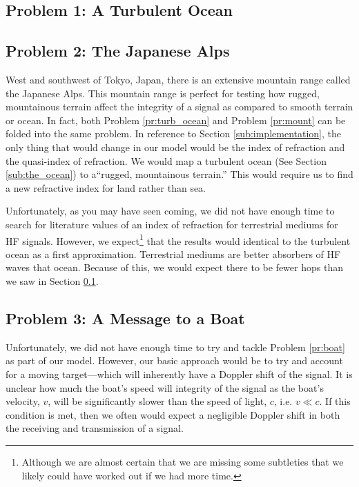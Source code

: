 \documentclass[11pt]{article}
\numberwithin{equation}{section}
\begin{document}
 \subsection{Problem 1: A Turbulent Ocean} %
 \label{sub:part_i}

 \subsection{Problem 2: The Japanese Alps} %
 \label{sub:part_ii}
 West and southwest of Tokyo, Japan, there is an extensive mountain range called the Japanese Alps. This mountain range is perfect for testing how rugged, mountainous terrain affect the integrity of a signal as compared to smooth terrain or ocean. In fact, both Problem \ref{pr:turb_ocean} and Problem \ref{pr:mount} can be folded into the same problem. In reference to Section \ref{sub:implementation}, the only thing that would change in our model would be the index of refraction and the quasi-index of refraction. We would map a turbulent ocean (See Section \ref{sub:the_ocean}) to  a``rugged, mountainous terrain.'' This would require us to find a new refractive index for land rather than sea.

 Unfortunately, as you may have seen coming, we did not have enough time to search for literature values of an index of refraction for terrestrial mediums for HF signals. However, we expect\footnote{Although we are almost certain that we are missing some subtleties that we likely could have worked out if we had more time. }  that the results would identical to the turbulent ocean as a first approximation. Terrestrial mediums are better absorbers of HF waves that ocean. Because of this, we would expect there to be fewer hops than we saw in Section \ref{sub:part_i}.

 \subsection{Problem 3: A Message to a Boat} %
 \label{sub:part_iii}
 
 Unfortunately, we did not have enough time to try and tackle Problem \ref{pr:boat} as part of our model. However, our basic approach would be to try and account for a moving target---which will inherently have a Doppler shift of the signal.\cite{taylor2005classical} It is unclear how much the boat's speed will integrity of the signal as the boat's velocity, $v$, will be significantly slower than the speed of light, $c$, i.e. $v\ll c$. If this condition is met, then we often would expect a negligible Doppler shift in both the receiving and transmission of a signal.
\end{document}
